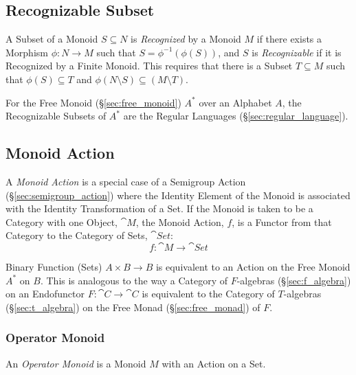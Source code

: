 \subsection{Recognizable Subset}\label{sec:recognizable}

A Subset of a Monoid $S \subseteq N$ is \emph{Recognized} by a Monoid $M$ if
there exists a Morphism $\phi : N \rightarrow M$ such that $S =
\phi^{-1}(\phi(S))$, and $S$ is \emph{Recognizable} if it is Recognized by a
Finite Monoid. This requires that there is a Subset $T \subseteq M$ such that
$\phi(S) \subseteq T$ and $\phi(N \setminus S) \subseteq (M \setminus T)$.

For the Free Monoid (\S\ref{sec:free_monoid}) $A^*$ over an Alphabet
$A$, the Recognizable Subsets of $A^*$ are the Regular Languages
(\S\ref{sec:regular_language}).



\subsection{Monoid Action}\label{sec:monoid_action}

A \emph{Monoid Action} is a special case of a Semigroup Action
(\S\ref{sec:semigroup_action}) where the Identity Element of the
Monoid is associated with the Identity Transformation of a Set. If the
Monoid is taken to be a Category with one Object, $\cat{M}$, the
Monoid Action, $f$, is a Functor from that Category to the Category of
Sets, $\cat{Set}$:
\[
  f : \cat{M} \rightarrow \cat{Set}
\]

Binary Function (Sets) $A \times B \rightarrow B$ is equivalent to an
Action on the Free Monoid $A^*$ on $B$. This is analogous to the way a
Category of $F$-algebras (\S\ref{sec:f_algebra}) on an Endofunctor $F
: \cat{C} \rightarrow \cat{C}$ is equivalent to the Category of
$T$-algebras (\S\ref{sec:t_algebra}) on the Free Monad
(\S\ref{sec:free_monad}) of $F$.



\subsubsection{Operator Monoid}\label{sec:operator_monoid}

An \emph{Operator Monoid} is a Monoid $M$ with an Action on a Set.



